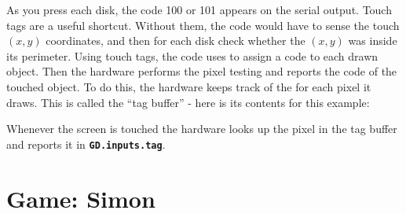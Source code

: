 \documentclass[10pt]{book}
\makeatletter
\newcommand{\mach}[1]{\texttt{\textbf{#1}}}
\newcommand{\cmdidx}[1]{
\index{#1@\mach{#1()}}
}
\newcommand{\dcmd}[1]{\cmdidx{#1}\nameref{#1}}
\makeatother
\begin{document}

As you press each disk, the code 100 or 101 appears on the serial output.
Touch tags are a useful shortcut.
Without them, the code would have to sense the touch $(x,y)$ coordinates,
and then for each disk check whether the $(x,y)$ was inside its perimeter.
Using touch tags, the code uses \dcmd{Tag} to assign a code to each drawn object.
Then the hardware performs the pixel testing and reports the code of the touched object.
To do this, the hardware keeps track of the \dcmd{Tag} for each pixel it draws.
This is called the ``tag buffer'' - here is its contents for this example:

\vspace{10pt}


\vspace{10pt}

\noindent
Whenever the screen is touched the hardware looks up the pixel in the tag buffer and reports it in
\mach{GD.inputs.tag}.

\cleartoleftpage
\section{Game: Simon}
\label{simon}
\end{document}
